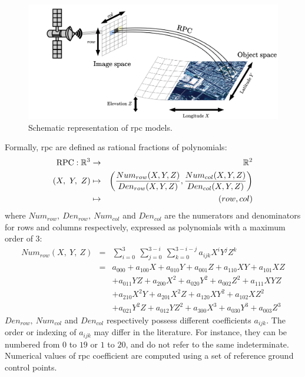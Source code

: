 \begin{figure}
    \centering
    \includegraphics[width=0.8\linewidth]{Images/Chap_1/RPC_model.png}
    \caption{Schematic representation of \acrshort{rpc} models.}
    \label{fig:RPC_models}
\end{figure}

Formally, \acrshort{rpc} are defined as rational fractions of polynomials:  
\begin{eqnarray}
    \mathrm{RPC}:\mathbb{R}^3 &\rightarrow&\mathbb{R}^2\nonumber\\
    (X,~Y,~Z) 	&\mapsto& \left(\frac{Num_{row}(X,Y,Z)}{Den_{row}(X,Y,Z)}, \frac{Num_{col}(X,Y,Z)}{Den_{col}(X,Y,Z)}\right)\nonumber\\
    &\mapsto&(row,col)\label{eq:rpc}
\end{eqnarray}
where $Num_{row},~Den_{row},~Num_{col}$ and $Den_{col}$ are the numerators and denominators for rows and columns respectively, expressed as polynomials with a maximum order of $3$:
\begin{eqnarray*}
    Num_{row}(X,~Y,~Z) &=& \sum_{i=0}^3~\sum_{j=0}^{3-i}~\sum_{k=0}^{3-i-j}a_{ijk}X^iY^jZ^k\\
    &=& a_{000} + a_{100} X + a_{010} Y + a_{001} Z + a_{110} XY + a_{101} XZ \\
    &&+ a_{011} YZ + a_{200} X^2 + a_{020} Y^2 + a_{002} Z^2 + a_{111} XYZ \\
    && + a_{210} X^2Y + a_{201} X^2Z + a_{120} XY^2 + a_{102} XZ^2\\
    && + a_{021} Y^2Z + a_{012} YZ^2 + a_{300} X^3 + a_{030} Y^3 + a_{003} Z^3
\end{eqnarray*}
$Den_{row},~Num_{col}$ and $Den_{col}$ respectively possess different coefficients $a_{ijk}$. The order or indexing of $a_{ijk}$ may differ in the literature. For instance, they can be numbered from $0$ to $19$ or $1$ to $20$, and do not refer to the same indeterminate. Numerical values of \acrshort{rpc} coefficient are computed using a set of reference ground control points.

